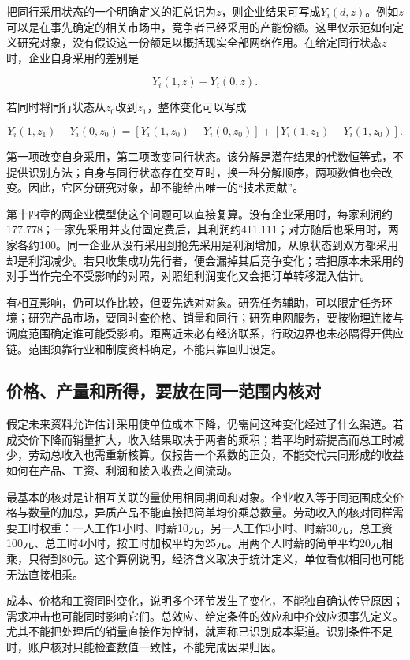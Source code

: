 \documentclass[UTF8,fontset=windows,12pt,a4paper,oneside,openany]{ctexbook}
\begin{document}
把同行采用状态的一个明确定义的汇总记为\(z\)，则企业结果可写成\(Y_i(d,z)\)。例如\(z\)可以是在事先确定的相关市场中，竞争者已经采用的产能份额。这里仅示范如何定义研究对象，没有假设这一份额足以概括现实全部网络作用。在给定同行状态\(z\)时，企业自身采用的差别是

\[
Y_i(1,z)-Y_i(0,z).
\tag{3-5}
\]

若同时将同行状态从\(z_0\)改到\(z_1\)，整体变化可以写成

\[
Y_i(1,z_1)-Y_i(0,z_0)
=\left[Y_i(1,z_0)-Y_i(0,z_0)\right]
+\left[Y_i(1,z_1)-Y_i(1,z_0)\right].
\tag{3-6}
\]

第一项改变自身采用，第二项改变同行状态。该分解是潜在结果的代数恒等式，不提供识别方法；自身与同行状态存在交互时，换一种分解顺序，两项数值也会改变。因此，它区分研究对象，却不能给出唯一的“技术贡献”。

第十四章的两企业模型使这个问题可以直接复算。没有企业采用时，每家利润约177.778；一家先采用并支付固定费后，其利润约411.111；对方随后也采用时，两家各约100。同一企业从没有采用到抢先采用是利润增加，从原状态到双方都采用却是利润减少。若只收集成功先行者，便会漏掉其后竞争变化；若把原本未采用的对手当作完全不受影响的对照，对照组利润变化又会把订单转移混入估计。

有相互影响，仍可以作比较，但要先选对对象。研究任务辅助，可以限定任务环境；研究产品市场，要同时查价格、销量和同行；研究电网服务，要按物理连接与调度范围确定谁可能受影响。距离近未必有经济联系，行政边界也未必隔得开供应链。范围须靠行业和制度资料确定，不能只靠回归设定。

\subsection{价格、产量和所得，要放在同一范围内核对}

假定未来资料允许估计采用使单位成本下降，仍需问这种变化经过了什么渠道。若成交价下降而销量扩大，收入结果取决于两者的乘积；若平均时薪提高而总工时减少，劳动总收入也需重新核算。仅报告一个系数的正负，不能交代共同形成的收益如何在产品、工资、利润和接入收费之间流动。

最基本的核对是让相互关联的量使用相同期间和对象。企业收入等于同范围成交价格与数量的加总，异质产品不能直接把简单均价乘总数量。劳动收入的核对同样需要工时权重：一人工作1小时、时薪10元，另一人工作3小时、时薪30元，总工资100元、总工时4小时，按工时加权平均为25元。用两个人时薪的简单平均20元相乘，只得到80元。这个算例说明，经济含义取决于统计定义，单位看似相同也可能无法直接相乘。

成本、价格和工资同时变化，说明多个环节发生了变化，不能独自确认传导原因；需求冲击也可能同时影响它们。总效应、给定条件的效应和中介效应须事先定义。尤其不能把处理后的销量直接作为控制，就声称已识别成本渠道。识别条件不足时，账户核对只能检查数值一致性，不能完成因果归因。
\end{document}
